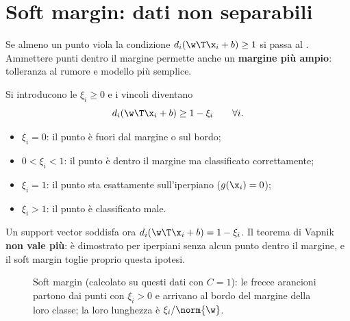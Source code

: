 \section{Soft margin: dati non separabili}

Se almeno un punto viola la condizione $d_i(\w\T\x_i+b)\ge1$ si passa al . Ammettere punti
dentro il margine permette anche un \textbf{margine più ampio}: tolleranza al rumore e modello più semplice.

Si introducono le  $\xi_i\ge0$ e i vincoli diventano
\[
d_i(\w\T\x_i+b)\ge1-\xi_i\qquad\forall i .
\]
\begin{itemize}
  \item $\xi_i=0$: il punto è fuori dal margine o sul bordo;
  \item $0<\xi_i<1$: il punto è dentro il margine ma classificato correttamente;
  \item $\xi_i=1$: il punto sta esattamente sull'iperpiano ($g(\x_i)=0$);
  \item $\xi_i>1$: il punto è classificato male.
\end{itemize}
Un support vector soddisfa ora $d_i(\w\T\x_i+b) = 1-\xi_i$. Il teorema di Vapnik \textbf{non vale più}: è
dimostrato per iperpiani senza alcun punto dentro il margine, e il soft margin toglie proprio questa ipotesi.

\begin{figure}[ht]
\centering
{}
\caption{Soft margin (calcolato su questi dati con $C=1$): le frecce arancioni partono dai punti con $\xi_i>0$ e
arrivano al bordo del margine della loro classe; la loro lunghezza è $\xi_i/\norm{\w}$.}
\label{fig:soft-margin}
\end{figure}

